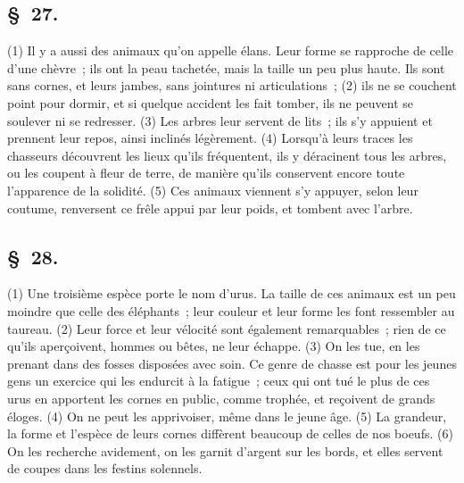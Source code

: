 \documentclass[french,twoside]{book} %
\begin{document}
\subsection[{§ 27.}]{ \textsc{§ 27.} }
\noindent (1) Il y a aussi des animaux qu’on appelle élans. Leur forme se rapproche de celle d’une chèvre ; ils ont la peau tachetée, mais la taille un peu plus haute. Ils sont sans cornes, et leurs jambes, sans jointures ni articulations ; (2) ils ne se couchent point pour dormir, et si quelque accident les fait tomber, ils ne peuvent se soulever ni se redresser. (3) Les arbres leur servent de lits ; ils s’y appuient et prennent leur repos, ainsi inclinés légèrement. (4) Lorsqu’à leurs traces les chasseurs découvrent les lieux qu’ils fréquentent, ils y déracinent tous les arbres, ou les coupent à fleur de terre, de manière qu’ils conservent encore toute l’apparence de la solidité. (5) Ces animaux viennent s’y appuyer, selon leur coutume, renversent ce frêle appui par leur poids, et tombent avec l’arbre.
\subsection[{§ 28.}]{ \textsc{§ 28.} }
\noindent (1) Une troisième espèce porte le nom d’urus. La taille de ces animaux est un peu moindre que celle des éléphants ; leur couleur et leur forme les font ressembler au taureau. (2) Leur force et leur vélocité sont également remarquables ; rien de ce qu’ils aperçoivent, hommes ou bêtes, ne leur échappe. (3) On les tue, en les prenant dans des fosses disposées avec soin. Ce genre de chasse est pour les jeunes gens un exercice qui les endurcit à la fatigue ; ceux qui ont tué le plus de ces urus en apportent les cornes en public, comme trophée, et reçoivent de grands éloges. (4) On ne peut les apprivoiser, même dans le jeune âge. (5) La grandeur, la forme et l’espèce de leurs cornes diffèrent beaucoup de celles de nos boeufs. (6) On les recherche avidement, on les garnit d’argent sur les bords, et elles servent de coupes dans les festins solennels.
\end{document}
